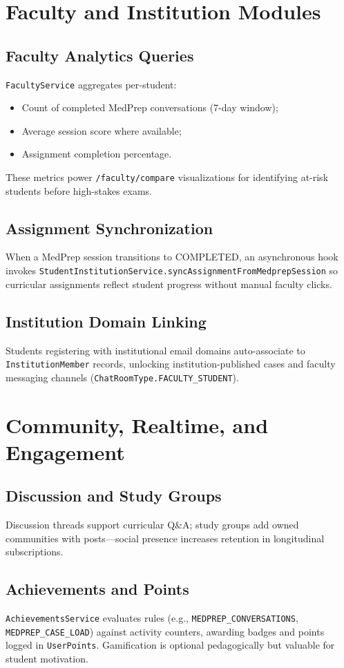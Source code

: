\section{Faculty and Institution Modules}
\subsection{Faculty Analytics Queries}
\texttt{FacultyService} aggregates per-student:
\begin{itemize}
  \item Count of completed MedPrep conversations (7-day window);
  \item Average session score where available;
  \item Assignment completion percentage.
\end{itemize}
These metrics power \texttt{/faculty/compare} visualizations for identifying at-risk students before high-stakes exams.

\subsection{Assignment Synchronization}
When a MedPrep session transitions to COMPLETED, an asynchronous hook invokes \texttt{StudentInstitutionService.syncAssignmentFromMedprepSession} so curricular assignments reflect student progress without manual faculty clicks.

\subsection{Institution Domain Linking}
Students registering with institutional email domains auto-associate to \texttt{InstitutionMember} records, unlocking institution-published cases and faculty messaging channels (\texttt{ChatRoomType.FACULTY\_STUDENT}).

\section{Community, Realtime, and Engagement}
\subsection{Discussion and Study Groups}
Discussion threads support curricular Q\&A; study groups add owned communities with posts---social presence increases retention in longitudinal subscriptions.

\subsection{Achievements and Points}
\texttt{AchievementsService} evaluates rules (e.g., \texttt{MEDPREP\_CONVERSATIONS}, \texttt{MEDPREP\_CASE\_LOAD}) against activity counters, awarding badges and points logged in \texttt{UserPoints}. Gamification is optional pedagogically but valuable for student motivation.

